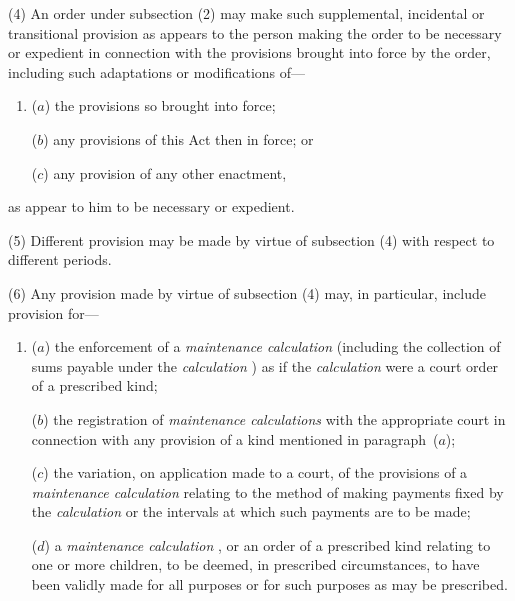 \documentclass[12pt,a4paper]{article}
\begin{document}
(4) An order under subsection (2)  may make such supplemental, incidental or transitional provision as appears to the person making the order to be necessary or expedient in connection with the provisions brought into force by the order, including such adaptations or modifications of—
\begin{enumerate}\item[]
($a$) the provisions so brought into force;

($b$) any provisions of this Act then in force; or

($c$) any provision of any other enactment,
\end{enumerate}
as appear to him to be necessary or expedient.

(5) Different provision may be made by virtue of subsection (4)  with respect to different periods.

(6) Any provision made by virtue of subsection (4)  may, in particular, include provision for—
\begin{enumerate}\item[]
($a$) the enforcement of a 
\emph{maintenance calculation}  %
(including the collection of sums payable under the 
\emph{calculation}%
) as if the 
\emph{calculation}  %
were a court order of a prescribed kind;

($b$) the registration of 
\emph{maintenance calculations}  %
with the appropriate court in connection with any provision of a kind mentioned in paragraph~($a$);

($c$) the variation, on application made to a court, of the provisions of a 
\emph{maintenance calculation}  %
relating to the method of making payments fixed by the 
\emph{calculation}  %
or the intervals at which such payments are to be made;

($d$) a 
\emph{maintenance calculation}%
, or an order of a prescribed kind relating to one or more children, to be deemed, in prescribed circumstances, to have been validly made for all purposes or for such purposes as may be prescribed.
\end{enumerate}
\end{document}
